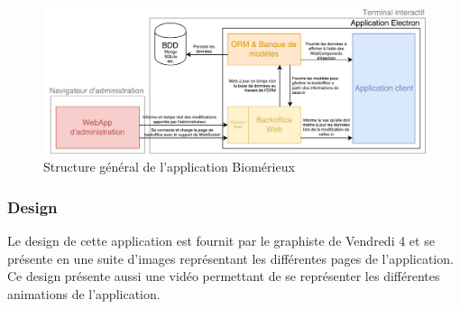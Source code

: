 \documentclass{article}
\begin{document}
\begin{landscape}
    \begin{figure}[h]
        \centering
        \includegraphics[scale=0.9]{Proposition-utopia.pdf}
        \caption{Structure général de l'application Biomérieux}
    \end{figure}
\end{landscape}

\clearpage

\subsubsection{Design}

Le design de cette application est fournit par le graphiste de Vendredi 4 et se présente en une suite d'images représentant les différentes pages de l'application.
Ce design présente aussi une vidéo permettant de se représenter les différentes animations de l'application.
\end{document}
